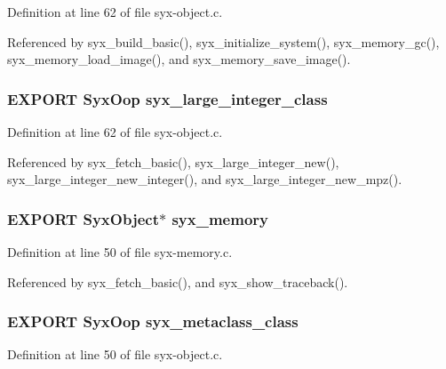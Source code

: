 Definition at line 62 of file syx-object.c.

Referenced by syx\_\-build\_\-basic(), syx\_\-initialize\_\-system(), syx\_\-memory\_\-gc(), syx\_\-memory\_\-load\_\-image(), and syx\_\-memory\_\-save\_\-image().\hypertarget{syx-object_8h_56d7e3f1e550bc346b3fd6cbcb31c6a2}{
\subsubsection{\setlength{\rightskip}{0pt plus 5cm}EXPORT {\bf SyxOop} {\bf syx\_\-large\_\-integer\_\-class}}}
\label{syx-object_8h_56d7e3f1e550bc346b3fd6cbcb31c6a2}




Definition at line 62 of file syx-object.c.

Referenced by syx\_\-fetch\_\-basic(), syx\_\-large\_\-integer\_\-new(), syx\_\-large\_\-integer\_\-new\_\-integer(), and syx\_\-large\_\-integer\_\-new\_\-mpz().\hypertarget{syx-object_8h_596eb1af08585a501808735d80503037}{
\subsubsection{\setlength{\rightskip}{0pt plus 5cm}EXPORT {\bf SyxObject}$\ast$ {\bf syx\_\-memory}}}
\label{syx-object_8h_596eb1af08585a501808735d80503037}




Definition at line 50 of file syx-memory.c.

Referenced by syx\_\-fetch\_\-basic(), and syx\_\-show\_\-traceback().\hypertarget{syx-object_8h_c9c6222aa1286578c4d077429047ca3e}{
\subsubsection{\setlength{\rightskip}{0pt plus 5cm}EXPORT {\bf SyxOop} {\bf syx\_\-metaclass\_\-class}}}
\label{syx-object_8h_c9c6222aa1286578c4d077429047ca3e}




Definition at line 50 of file syx-object.c.

